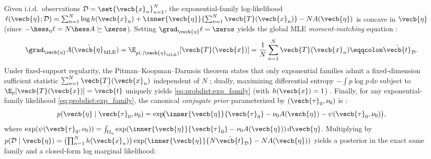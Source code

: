 \documentclass[../../../../master.tex]{subfiles}
\begin{document}
\begin{coremath}
Given i.i.d.\ observations $\mathcal{D} = \set{\vecb{x}_n}_{n=1}^N$, the exponential-family log-likelihood $\ell(\vecb{\eta};\mathcal{D}) = \sum_{n=1}^N \log h(\vecb{x}_n) + \inner{\vecb{\eta}}{\sum_{n=1}^N \vecb{T}(\vecb{x}_n)} - N A(\vecb{\eta})$ is concave in $\vecb{\eta}$ (since $-\hess_\eta \ell = N\hess A \succeq \zeros$). Setting $\grad_{\vecb{\eta}}\ell = \zeros$ yields the global MLE \emph{moment-matching} equation  :
\begin{equation}\label{eq:probdist:mle_moment_match}
  \grad_{\vecb{\eta}} A(\hat{\vecb{\eta}}_{\mathrm{MLE}})
  = \E_{p(\cdot\mid\hat{\vecb{\eta}}_{\mathrm{MLE}})}[\vecb{T}(\vecb{x})]
  = \frac{1}{N}\sum_{n=1}^N \vecb{T}(\vecb{x}_n) \eqqcolon \bar{\vecb{t}}_{\mathcal{D}}.
\end{equation}
Under fixed-support regularity, the Pitman--Koopman--Darmois theorem states that only exponential families admit a fixed-dimension sufficient statistic $\sum_{n=1}^N \vecb{T}(\vecb{x}_n)$ independent of $N$ ; dually, maximizing differential entropy $-\int p\log p\,\mathrm{d}\nu$ subject to $\E_p[\vecb{T}(\vecb{x})] = \bar{\vecb{t}}$ uniquely yields \eqref{eq:probdist:exp_family} (with $h(\vecb{x})=1$) . Finally, for any exponential-family likelihood \eqref{eq:probdist:exp_family}, the canonical \emph{conjugate prior} parameterized by $(\vecb{\tau}_0, \nu_0)$ is  :
\begin{equation}\label{eq:probdist:conjugate_prior}
  p(\vecb{\eta} \mid \vecb{\tau}_0, \nu_0)
  = \exp\!\bigl(\inner{\vecb{\eta}}{\vecb{\tau}_0} - \nu_0 A(\vecb{\eta}) - \psi(\vecb{\tau}_0, \nu_0)\bigr),
\end{equation}
where $\exp(\psi(\vecb{\tau}_0, \nu_0)) = \int_{\Omega_\eta} \exp(\inner{\vecb{\eta}}{\vecb{\tau}_0} - \nu_0 A(\vecb{\eta}))\,\mathrm{d}\vecb{\eta}$. Multiplying by $p(\mathcal{D}\mid\vecb{\eta}) = \bigl(\prod_{n=1}^N h(\vecb{x}_n)\bigr)\exp(\inner{\vecb{\eta}}{N\bar{\vecb{t}}_{\mathcal{D}}} - N A(\vecb{\eta}))$ yields a posterior in the exact same family and a closed-form log marginal likelihood:

\end{coremath}
\end{document}
